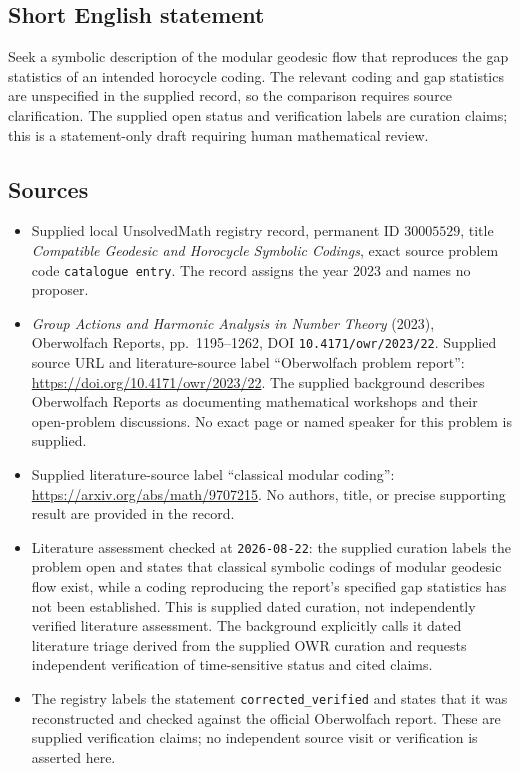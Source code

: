 \documentclass[11pt]{article}
\begin{document}
\subsection{Short English statement}
Seek a symbolic description of the modular geodesic flow that reproduces the gap statistics of an intended horocycle coding. The relevant coding and gap statistics are unspecified in the supplied record, so the comparison requires source clarification. The supplied open status and verification labels are curation claims; this is a statement-only draft requiring human mathematical review.
\subsection{Sources}
\begin{itemize}
\item Supplied local UnsolvedMath registry record, permanent ID \(30005529\), title \emph{Compatible Geodesic and Horocycle Symbolic Codings}, exact source problem code \texttt{catalogue entry}. The record assigns the year 2023 and names no proposer.
\item \emph{Group Actions and Harmonic Analysis in Number Theory} (2023), Oberwolfach Reports, pp.\ 1195--1262, DOI \texttt{10.4171/owr/2023/22}. Supplied source URL and literature-source label ``Oberwolfach problem report'': \url{https://doi.org/10.4171/owr/2023/22}. The supplied background describes Oberwolfach Reports as documenting mathematical workshops and their open-problem discussions. No exact page or named speaker for this problem is supplied.
\item Supplied literature-source label ``classical modular coding'': \url{https://arxiv.org/abs/math/9707215}. No authors, title, or precise supporting result are provided in the record.
\item Literature assessment checked at \texttt{2026-08-22}: the supplied curation labels the problem open and states that classical symbolic codings of modular geodesic flow exist, while a coding reproducing the report's specified gap statistics has not been established. This is supplied dated curation, not independently verified literature assessment. The background explicitly calls it dated literature triage derived from the supplied OWR curation and requests independent verification of time-sensitive status and cited claims.
\item The registry labels the statement \texttt{corrected\_verified} and states that it was reconstructed and checked against the official Oberwolfach report. These are supplied verification claims; no independent source visit or verification is asserted here.
\end{itemize}
\end{document}
